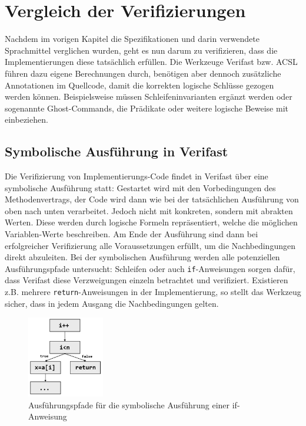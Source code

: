 ﻿\chapter{Vergleich der Verifizierungen}

Nachdem im vorigen Kapitel die Spezifikationen und darin verwendete Sprachmittel verglichen wurden,
geht es nun darum zu verifizieren, dass die Implementierungen diese tatsächlich erfüllen.
Die Werkzeuge Verifast bzw. ACSL führen dazu eigene Berechnungen durch, benötigen aber dennoch
zusätzliche Annotationen im Quellcode, damit die korrekten logische Schlüsse gezogen 
werden können. Beispielsweise müssen Schleifeninvarianten ergänzt werden oder sogenannte
Ghost-Commands, die Prädikate oder weitere logische Beweise mit einbeziehen.

\section{Symbolische Ausführung in Verifast}

Die Verifizierung von Implementierungs-Code findet in Verifast über eine symbolische Ausführung statt:
Gestartet wird mit den Vorbedingungen des Methodenvertrags, der Code wird dann wie bei der tatsächlichen
Ausführung von oben nach unten verarbeitet. Jedoch nicht mit konkreten, sondern mit 
abrakten Werten. Diese werden durch logische Formeln repräsentiert, welche die möglichen Variablen-Werte 
beschreiben. Am Ende der Ausführung sind dann bei erfolgreicher Verifizierung alle Voraussetzungen
erfüllt, um die Nachbedingungen direkt abzuleiten.
\newline
\newline
Bei der symbolischen Ausführung werden alle potenziellen Ausführungspfade untersucht: Schleifen
oder auch \texttt{if}-Anweisungen sorgen dafür, dass Verifast diese Verzweigungen einzeln betrachtet
und verifiziert. Existieren z.B. mehrere \texttt{return}-Anweisungen in der Implementierung, so stellt
das Werkzeug sicher, dass in jedem Ausgang die Nachbedingungen gelten.

\begin{figure}
	\centering
		\includegraphics[width=0.3\textwidth]{images/symbolic_execution.png}
		\caption{Ausführungspfade für die symbolische Ausführung einer if-Anweisung}
\end{figure}

